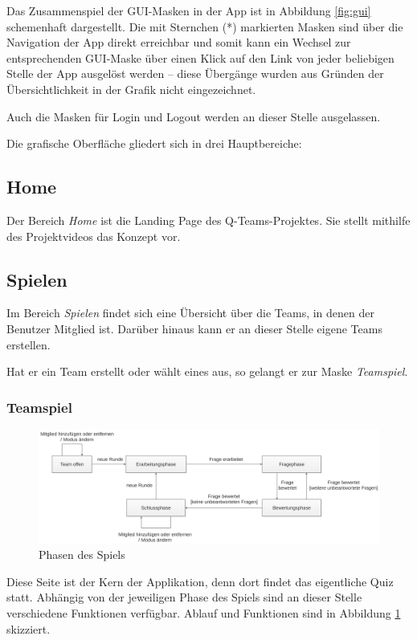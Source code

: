 \documentclass[a4paper,11pt,listof=numbered,glossary=totoc,parskip=half,toc=bib]{scrreprt}
\begin{document}
	Das Zusammenspiel der GUI-Masken in der App ist in Abbildung \ref{fig:gui} schemenhaft dargestellt. Die mit Sternchen (*) markierten Masken sind über die Navigation der App direkt erreichbar und somit kann ein Wechsel zur entsprechenden GUI-Maske über einen Klick auf den Link von jeder beliebigen Stelle der App ausgelöst werden -- diese Übergänge wurden aus Gründen der Übersichtlichkeit in der Grafik nicht eingezeichnet.
	
	Auch die Masken für Login und Logout werden an dieser Stelle ausgelassen.
	
	Die grafische Oberfläche gliedert sich in drei Hauptbereiche:
		
	\subsection{Home}
	Der Bereich \textit{Home} ist die Landing Page des Q-Teams-Projektes. Sie stellt mithilfe des Projektvideos das Konzept vor.

	\subsection{Spielen}
	Im Bereich \textit{Spielen} findet sich eine Übersicht über die Teams, in denen der Benutzer Mitglied ist. Darüber hinaus kann er an dieser Stelle eigene Teams erstellen.
	
	Hat er ein Team erstellt oder wählt eines aus, so gelangt er zur Maske \textit{Teamspiel}.
	
	\subsubsection{Teamspiel}	

	\begin{figure}
		\centering
		\includegraphics[width=\textwidth]{ablauf}
		\caption{Phasen des Spiels}
		\label{fig:phasen}
	\end{figure}
		
	Diese Seite ist der Kern der Applikation, denn dort findet das eigentliche Quiz statt. Abhängig von der jeweiligen Phase des Spiels sind an dieser Stelle verschiedene Funktionen verfügbar. Ablauf und Funktionen sind in Abbildung \ref{fig:phasen} skizziert.
	
\end{document}

